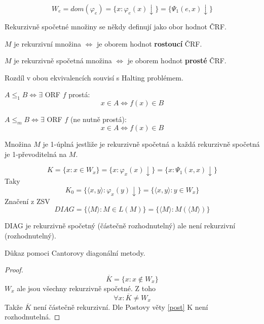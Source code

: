 \begin{definition}
	\[ W_e = dom(\varphi_e) = \{ x: \varphi_e(x) \downarrow \} = \{ \Psi_1(e, x) \downarrow \} \]
\end{definition}

\begin{note}
	Rekurzivně spočetné množiny se někdy definují jako obor hodnot ČRF.

	$M$ je rekurzivní množina $\iff$ je oborem hodnot \textbf{rostoucí} ČRF.

	$M$ je rekurzivně spočetná množina $\iff$ je oborem hodnot \textbf{prosté} ČRF.

	Rozdíl v obou ekvivalencích souvisí s Halting problémem.
\end{note}

\begin{definition}[1,m převoditelnost]
	$A \leq_1 B \iff \exists$ ORF $f$ prostá:
	\[ x \in A \iff f(x) \in B \]

	$A \leq_m B \iff \exists$ ORF $f$ (ne nutně prostá):
	\[ x \in A \iff f(x) \in B \]
\end{definition}

\begin{definition}[1-úplnost]
	Množina $M$ je 1-úplná jestliže je rekurzivně spočetná a každá rekurzivně spočetná je 1-převoditelná na $M$.
\end{definition}

\begin{definition}[K, DIAG]
	\[ K = \{ x: x \in W_x \} = \{ x: \varphi_x(x) \downarrow \} = \{ x: \Psi_1(x, x) \downarrow \} \]
	Taky
	\[ K_0 = \{ \langle x, y \rangle: \varphi_x(y) \downarrow \} = \{ \langle x, y \rangle: y \in W_x \} \]
	Značení z ZSV
	\[ DIAG = \{ \langle M \rangle: M \in L(M) \} = \{ \langle M \rangle: M(\langle M \rangle) \} \]
\end{definition}

\begin{lemma}[DIAG, K]
	DIAG je rekurzivně spočetný (částečně rozhodnutelný) ale není rekurzivní (rozhodnutelný).

	Důkaz pomoci Cantorovy diagonální metody.
\end{lemma}
\begin{proof}
	\[ \overline{K} = \{ x: x \notin W_x \} \]
	$W_x$ ale jsou všechny rekurzivně spočetné.
	Z toho
	\[ \forall x: \overline{K} \neq W_x \]
	Takže $\overline{K}$ není částečně rekurzivní.
	Dle Postovy věty \cref{post} K není rozhodnutelná.
\end{proof}

